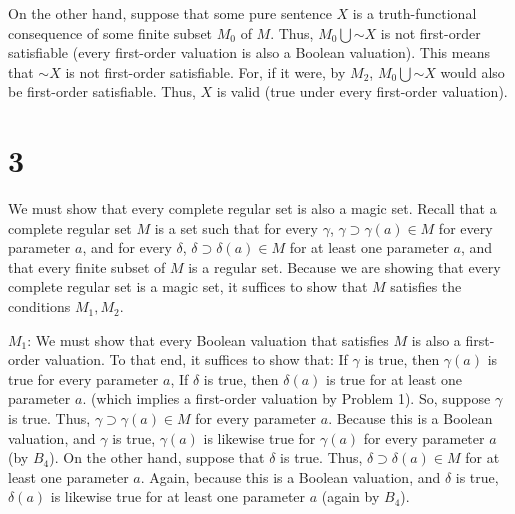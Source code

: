 \documentclass{article}
\newcommand*{\oldneg}{\mathord{\sim}}
\theoremstyle{definition}
\begin{document}
On the other hand, suppose that some pure sentence $X$ is a truth-functional consequence of some finite subset $M_0$ of $M$. 
Thus, $M_0\bigcup {\oldneg X}$ is not first-order satisfiable (every first-order valuation is also a Boolean valuation). 
This means 
that $\oldneg X$ is not first-order satisfiable. For, if it were, by $M_2$, $M_0\bigcup {\oldneg X}$ would also be first-order 
satisfiable. 
Thus, $X$ is valid (true under every first-order valuation). 

\section*{3}


We must show that every complete regular set is also a magic set. Recall that a complete regular set $M$ is a set such that 
for every $\gamma$, $\gamma\supset \gamma(a)\in M$ for every parameter $a$, and for every $\delta$, $\delta\supset \delta(a)\in M$ 
for at least one parameter $a$, and that every finite subset of $M$ is a regular set. Because we are showing that every complete 
regular set is a magic set, it suffices to show that $M$ satisfies the conditions $M_1,M_2$.


$M_1$: We must show that every Boolean valuation that satisfies $M$ is also a first-order valuation. To that end, it suffices to 
show that:\newline
If $\gamma$ is true, then $\gamma(a)$ is true for every parameter $a$,\newline
If $\delta$ is true, then $\delta(a)$ is true for at least one parameter $a$.\newline
(which implies a first-order valuation by Problem 1). So, suppose $\gamma$ is true. Thus, $\gamma\supset\gamma(a)\in M$ for 
every parameter $a$. Because this is a Boolean valuation, and $\gamma$ is true, $\gamma(a)$ is likewise true for $\gamma(a)$ 
for every parameter $a$ (by $B_4$). On the other hand, suppose that $\delta$ is true. 
Thus, $\delta\supset\delta(a)\in M$ for at least one
parameter $a$. Again, because this is a Boolean valuation, and $\delta$ is true, $\delta(a)$ is likewise true for at least one 
parameter $a$ (again by $B_4$). 
\end{document}
